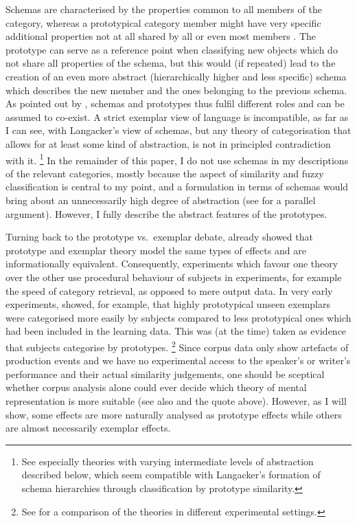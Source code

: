 Schemas are characterised by the properties common to all members of the category, whereas a prototypical category member might have very specific additional properties not at all shared by all or even most members \citep[371-375]{Langacker1987}.
The prototype can serve as a reference point when classifying new objects which do not share all properties of the schema, but this would (if repeated) lead to the creation of an even more abstract (hierarchically higher and less specific) schema which describes the new member and the ones belonging to the previous schema.
As pointed out by \citet[136--137]{Langacker1987}, schemas and prototypes thus fulfil different roles and can be assumed to co-exist.
A strict exemplar view of language is incompatible, as far as I can see, with Langacker's view of schemas, but any theory of categorisation that allows for at least some kind of abstraction, is not in principled contradiction with it.%
\footnote{See especially theories with varying intermediate levels of abstraction described below, which seem compatible with Langacker's formation of schema hierarchies through classification by prototype similarity.}
In the remainder of this paper, I do not use schemas in my descriptions of the relevant categories, mostly because the aspect of similarity and fuzzy classification is central to my point, and a formulation in terms of schemas would bring about an unnecessarily high degree of abstraction (see \citealp[70--71]{Taylor2003} for a parallel argument).
However, I fully describe the abstract features of the prototypes.

Turning back to the prototype vs.\ exemplar debate, \cite{Barsalou1990} already showed that prototype and exemplar theory model the same types of effects and are informationally equivalent.
Consequently, experiments which favour one theory over the other use procedural behaviour of subjects in experiments, for example the speed of category retrieval, as opposed to mere output data.
In very early experiments, \cite{PosnerKeele1968} showed, for example, that highly prototypical unseen exemplars were categorised more easily by subjects compared to less prototypical ones which had been included in the learning data.
This was (at the time) taken as evidence that subjects categorise by prototypes.%
\footnote{See \citet{StormsEa2000} for a comparison of the theories in different experimental settings.}
Since corpus data only show artefacts of production events and we have no experimental access to the speaker's or writer's performance and their actual similarity judgements, one should be sceptical whether corpus analysis alone could ever decide which theory of mental representation is more suitable (see also \citealp[22]{Gries2003} and the \citealp[486--487]{Dabrowska2016} quote above).
However, as I will show, some effects are more naturally analysed as prototype effects while others are almost necessarily exemplar effects.

